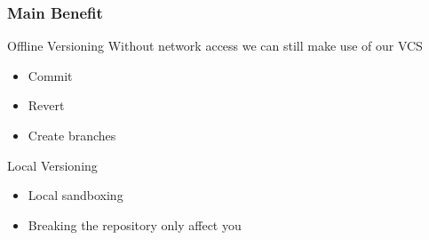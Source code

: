 \begin{frame}
	\frametitle{Main Benefit}
	\begin{block}{Offline Versioning}
		Without network access we can still make use of our VCS
		\begin{itemize}
			\item Commit
			\item Revert
			\item Create branches
		\end{itemize}
	\end{block}
	\begin{block}{Local Versioning}
		\begin{itemize}
			\item Local sandboxing
			\item Breaking the repository only affect you
		\end{itemize}
	\end{block}
\end{frame}
